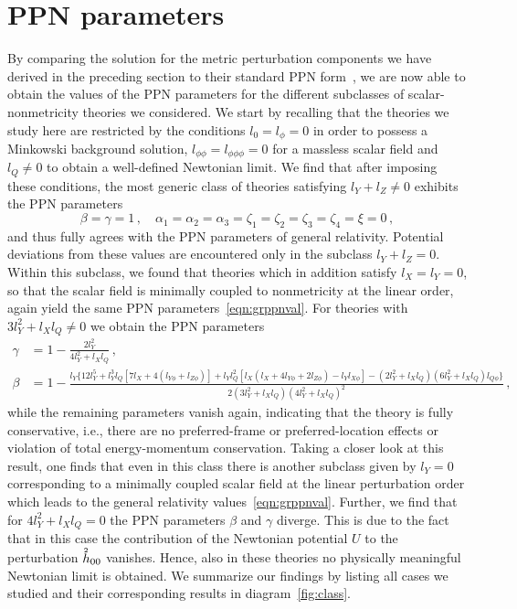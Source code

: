 \documentclass[notitlepage,a4paper,aps,prd,onecolumn,superscriptaddress,nofootinbib,groupedaddress,longbibliography]{revtex4-2}
\newcommand{\order}[2]{\accentset{#2}{#1}}
\begin{document}
\section{PPN parameters}\label{sec:param}
By comparing the solution for the metric perturbation components we have derived in the preceding section to their standard PPN form~\cite{Will:1993ns,Will:2014kxa}, we are now able to obtain the values of the PPN parameters for the different subclasses of scalar-nonmetricity theories we considered. We start by recalling that the theories we study here are restricted by the conditions \(l_0 = l_{\phi} = 0\) in order to possess a Minkowski background solution, \(l_{\phi\phi} = l_{\phi\phi\phi} = 0\) for a massless scalar field and \(l_Q \neq 0\) to obtain a well-defined Newtonian limit. We find that after imposing these conditions, the most generic class of theories satisfying \(l_Y + l_Z \neq 0\) exhibits the PPN parameters
\begin{equation}\label{eqn:grppnval}
\beta = \gamma = 1\,, \quad
\alpha_1 = \alpha_2 = \alpha_3 = \zeta_1 = \zeta_2 = \zeta_3 = \zeta_4 = \xi = 0\,,
\end{equation}
and thus fully agrees with the PPN parameters of general relativity. Potential deviations from these values are encountered only in the subclass \(l_Y + l_Z = 0\). Within this subclass, we found that theories which in addition satisfy \(l_X = l_Y = 0\), so that the scalar field is minimally coupled to nonmetricity at the linear order, again yield the same PPN parameters~\eqref{eqn:grppnval}. For theories with \(3l_Y^2 + l_Xl_Q \neq 0\) we obtain the PPN parameters
\begin{subequations}
\begin{align}
\gamma &= 1 - \frac{2l_Y^2}{4l_Y^2 + l_Xl_Q}\,,\\
\beta &= 1 - \frac{l_Y\{12l_Y^5 + l_Y^3l_Q[7l_X + 4(l_{Y\phi} + l_{Z\phi})] + l_Yl_Q^2[l_X(l_X + 4l_{Y\phi} + 2l_{Z\phi}) - l_Yl_{X\phi}] - (2l_Y^2 + l_Xl_Q)(6l_Y^2 + l_Xl_Q)l_{Q\phi}\}}{2(3l_Y^2 + l_Xl_Q)(4l_Y^2 + l_Xl_Q)^2}\,,
\end{align}
\end{subequations}
while the remaining parameters vanish again, indicating that the theory is fully conservative, i.e., there are no preferred-frame or preferred-location effects or violation of total energy-momentum conservation. Taking a closer look at this result, one finds that even in this class there is another subclass given by \(l_Y = 0\) corresponding to a minimally coupled scalar field at the linear perturbation order which leads to the general relativity values~\eqref{eqn:grppnval}. Further, we find that for \(4l_Y^2 + l_Xl_Q = 0\) the PPN parameters \(\beta\) and \(\gamma\) diverge. This is due to the fact that in this case the contribution of the Newtonian potential \(U\) to the perturbation \(\order{h}{2}_{00}\) vanishes. Hence, also in these theories no physically meaningful Newtonian limit is obtained. We summarize our findings by listing all cases we studied and their corresponding results in diagram~\ref{fig:class}.
\end{document}
